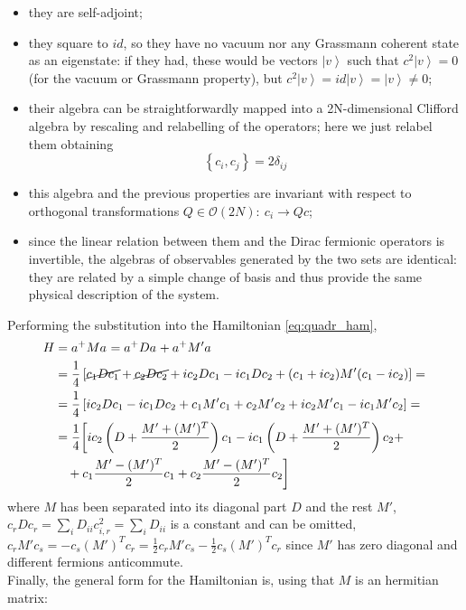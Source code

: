 \documentclass[a4paper,11pt]{article}
\theoremstyle{remark}
\newcommand{\ket}[1]{\left | #1 \right \rangle}
\begin{document}
   \begin{itemize}
   \item they are self-adjoint;
   \item they square to $id$, so they have no vacuum nor any Grassmann coherent state as an eigenstate: if they had, these would be vectors $\ket{v}$ such that $c^2\ket{v}=0$ (for the vacuum or Grassmann property), but $c^2\ket{v}=id\ket{v}=\ket{v}\neq 0$;
   \item their algebra can be straightforwardly mapped into a 2N-dimensional Clifford algebra by rescaling and relabelling of the operators; here we just relabel them obtaining 
   \begin{equation}
    \left\{c_{i},c_{j}\right\} = 2\delta_{ij}
    \label{eq:algebra_majorana}
   \end{equation}
   \item this algebra and the previous properties are invariant with respect to orthogonal transformations $Q\in\mathcal{O}(2N):\ c_i\rightarrow Qc$;
   \item since the linear relation between them and the Dirac fermionic operators is invertible, the algebras of observables generated by the two sets are identical: they are related by a simple change of basis and thus provide the same physical description of the system.
   \end{itemize}
   Performing the substitution into the Hamiltonian \ref{eq:quadr_ham},
    \begin{align*}
     H &= a^+Ma^{ } = a^+Da^{ } + a^+M'a^{ }\notag\\
       &=\frac{1}{4}\left[\cancel{c_1Dc_1} + \cancel{c_2Dc_2} +ic_2Dc_1-ic_1Dc_2+(c_1+ic_2)M'(c_1-ic_2)\right] =  \notag\\
       &=\frac{1}{4}\left[ic_2Dc_1-ic_1Dc_2+c_1M'c_1 + c_2M'c_2 +ic_2M'c_1-ic_1M'c_2\right]=\notag \\
       &=\frac{1}{4}\bigg[ic_2\left(D+\frac{M'+(M')^T}{2}\right)c_1-ic_1\left(D+\frac{M'+(M')^T}{2}\right)c_2 +\notag\\
       &\ \ \ +c_1\frac{M'-(M')^T}{2}c_1+c_2\frac{M'-(M')^T}{2}c_2\bigg]\notag
    \end{align*}
    where $M$ has been separated into its diagonal part $D$ and the rest $\displaystyle M'$, $c_rDc_r = \sum_iD_{ii}c_{i,r}^2 = \sum_i D_{ii}$ is a constant and can be omitted, $\displaystyle c_rM'c_s = - c_s(M')^Tc_r = \frac{1}{2}c_rM'c_s - \frac{1}{2}c_s(M')^Tc_r$ since $M'$ has zero diagonal and different fermions anticommute.\\ Finally, the general form for the Hamiltonian is, using that $M$ is an hermitian matrix:
\end{document}
